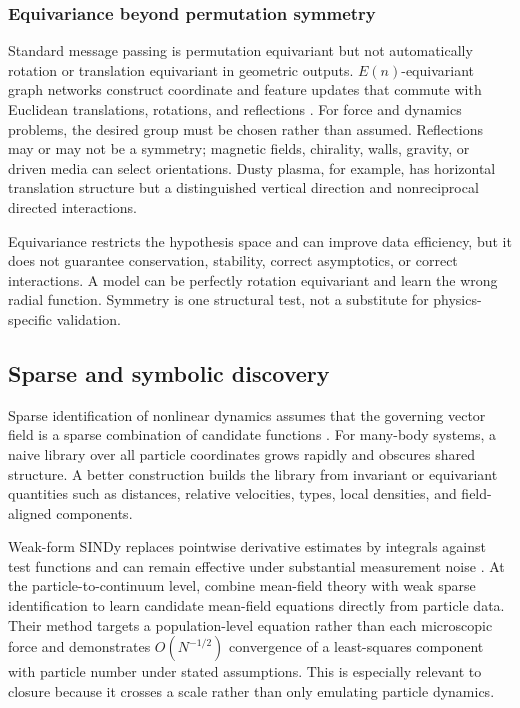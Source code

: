 \subsubsection{Equivariance beyond permutation symmetry}

Standard message passing is permutation equivariant but not automatically rotation or translation equivariant in geometric outputs. \(E(n)\)-equivariant graph networks construct coordinate and feature updates that commute with Euclidean translations, rotations, and reflections \citep{satorras2021egnn}. For force and dynamics problems, the desired group must be chosen rather than assumed. Reflections may or may not be a symmetry; magnetic fields, chirality, walls, gravity, or driven media can select orientations. Dusty plasma, for example, has horizontal translation structure but a distinguished vertical direction and nonreciprocal directed interactions.

Equivariance restricts the hypothesis space and can improve data efficiency, but it does not guarantee conservation, stability, correct asymptotics, or correct interactions. A model can be perfectly rotation equivariant and learn the wrong radial function. Symmetry is one structural test, not a substitute for physics-specific validation.

\subsection{Sparse and symbolic discovery}

Sparse identification of nonlinear dynamics assumes that the governing vector field is a sparse combination of candidate functions \citep{brunton2016sindy}. For many-body systems, a naive library over all particle coordinates grows rapidly and obscures shared structure. A better construction builds the library from invariant or equivariant quantities such as distances, relative velocities, types, local densities, and field-aligned components.

Weak-form SINDy replaces pointwise derivative estimates by integrals against test functions and can remain effective under substantial measurement noise \citep{messenger2021wsindy}. At the particle-to-continuum level, \citet{messenger2022meanfield} combine mean-field theory with weak sparse identification to learn candidate mean-field equations directly from particle data. Their method targets a population-level equation rather than each microscopic force and demonstrates \(O(N^{-1/2})\) convergence of a least-squares component with particle number under stated assumptions. This is especially relevant to closure because it crosses a scale rather than only emulating particle dynamics.

